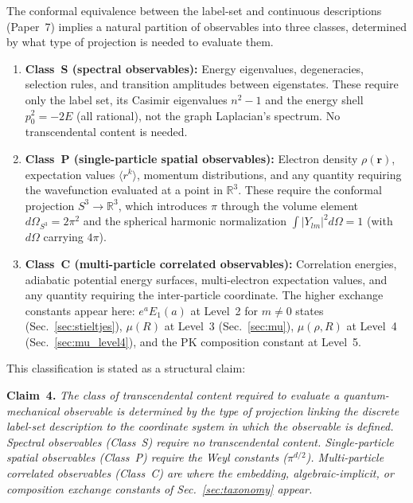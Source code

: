 \documentclass[aps,pra,twocolumn,superscriptaddress,longbibliography]{revtex4-2}
\begin{document}
The conformal equivalence between the label-set and continuous descriptions
(Paper~7) implies a natural partition of observables into three classes,
determined by what type of projection is needed to evaluate them.

\begin{enumerate}
  \item \textbf{Class~S (spectral observables):} Energy eigenvalues,
    degeneracies, selection rules, and transition amplitudes between
    eigenstates.  These require only the label set, its Casimir eigenvalues
    $n^2 - 1$ and the energy shell $p_0^2 = -2E$ (all rational), not
    the graph Laplacian's spectrum.  No transcendental content is
    needed.

  \item \textbf{Class~P (single-particle spatial observables):}
    Electron density $\rho(\mathbf{r})$, expectation values
    $\langle r^k \rangle$, momentum distributions, and any quantity
    requiring the wavefunction evaluated at a point in $\mathbb{R}^3$.
    These require the conformal projection $S^3 \to \mathbb{R}^3$,
    which introduces $\pi$ through the volume element
    $d\Omega_{S^3} = 2\pi^2$ and the spherical harmonic
    normalization $\int |Y_{lm}|^2 d\Omega = 1$ (with
    $d\Omega$ carrying $4\pi$).

  \item \textbf{Class~C (multi-particle correlated observables):}
    Correlation energies, adiabatic potential energy surfaces,
    multi-electron expectation values, and any quantity requiring
    the inter-particle coordinate.  The higher exchange constants appear
    here: $e^a E_1(a)$ at Level~2 for $m \neq 0$ states
    (Sec.~\ref{sec:stieltjes}), $\mu(R)$ at Level~3
    (Sec.~\ref{sec:mu}), $\mu(\rho,R)$ at Level~4
    (Sec.~\ref{sec:mu_level4}), and the PK composition constant
    at Level~5.
\end{enumerate}

\noindent This classification is stated as a structural claim:

\medskip
\noindent\textbf{Claim~4.}
\textit{The class of transcendental content required to evaluate a
quantum-mechanical observable is determined by the type of projection
linking the discrete label-set description to the coordinate system in
which the observable is defined.  Spectral observables (Class~S) require no
transcendental content.  Single-particle spatial observables (Class~P)
require the Weyl constants ($\pi^{d/2}$).  Multi-particle correlated
observables (Class~C) are where the embedding, algebraic-implicit, or
composition exchange constants of Sec.~\ref{sec:taxonomy} appear.}
\end{document}
